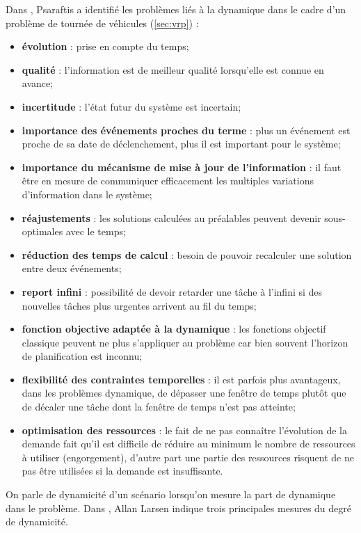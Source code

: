 Dans \cite{Psaraftis1988,Psaraftis1995}, Psaraftis a identifié les problèmes liés à la dynamique dans le cadre d'un problème de tournée de véhicules (\ref{sec:vrp}) :
\begin{itemize}
 \item \textbf{évolution} : prise en compte du temps;
 \item \textbf{qualité} : l'information est de meilleur qualité lorsqu'elle est connue en avance;
 \item \textbf{incertitude} : l'état futur du système est incertain;
 \item \textbf{importance des événements proches du terme} : plus un événement est proche de sa date de déclenchement, plus il est important pour le système;
 \item \textbf{importance du mécanisme de mise à jour de l'information} : il faut être en mesure de communiquer efficacement les multiples variations d'information dans le système;
 \item \textbf{réajustements} : les solutions calculées au préalables peuvent devenir sous-optimales avec le temps;
 \item \textbf{réduction des temps de calcul} : besoin de pouvoir recalculer une solution entre deux événements;
 \item \textbf{report infini} : possibilité de devoir retarder une tâche à l'infini si des nouvelles tâches plus urgentes arrivent au fil du temps;
 \item \textbf{fonction objective adaptée à la dynamique} : les fonctions objectif classique peuvent ne plus s'appliquer au problème car bien souvent l'horizon de planification est inconnu;
 \item \textbf{flexibilité des contraintes temporelles} : il est parfois plus avantageux, dans les problèmes dynamique, de dépasser une fenêtre de temps plutôt que de décaler une tâche dont la fenêtre de temps n'est pas atteinte;
 \item \textbf{optimisation des ressources} : le fait de ne pas connaître l'évolution de la demande fait qu'il est difficile de réduire au minimum le nombre de ressources à utiliser (engorgement), d'autre part une partie des ressources risquent de ne pas être utilisées si la demande est insuffisante.
\end{itemize}
 

On parle de dynamicité d'un scénario lorsqu'on mesure la part de dynamique dans le problème. Dans \cite{Larsen2000}, Allan Larsen indique trois principales mesures du degré de dynamicité.

